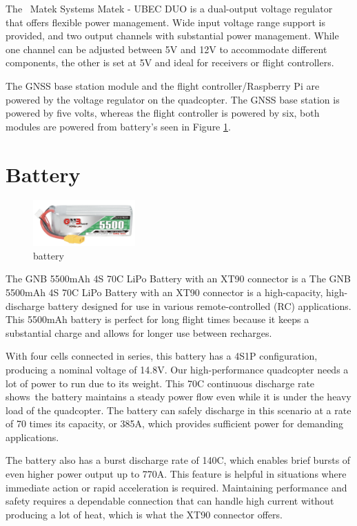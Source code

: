\documentclass{report}
\begin{document}
The  Matek Systems Matek - UBEC DUO is a dual-output voltage regulator that
offers flexible power management. Wide input voltage range support is provided,
and two output channels with substantial power management. While one channel can
be adjusted between 5V and 12V to accommodate different components, the other is
set at 5V and ideal for receivers or flight controllers.

The GNSS base station module and the flight controller/Raspberry Pi are powered
by the voltage regulator on the quadcopter. The GNSS base station is powered by
five volts, whereas the flight controller is powered by six, both modules are
powered from battery's seen in Figure \ref{battery}.

\section{Battery}\label{battery}
\begin{figure}[H]
  \centering
  \includegraphics[width=0.35\textwidth]{Pictures/battery.png}
  \caption{battery}
  \label{fig:battery}
\end{figure}
The GNB 5500mAh 4S 70C LiPo Battery with an XT90 connector is a The GNB 5500mAh
4S 70C LiPo Battery with an XT90 connector is a high-capacity, high-discharge
battery designed for use in various remote-controlled (RC) applications. This
5500mAh battery is perfect for long flight times because it keeps a substantial
charge and allows for longer use between recharges.

With four cells connected in series, this battery has a 4S1P configuration,
producing a nominal voltage of 14.8V. Our high-performance quadcopter needs a
lot of power to run due to its weight. This 70C continuous discharge rate
shows the battery maintains a steady power flow even while it is under the heavy
load of the quadcopter. The battery can safely discharge in this scenario at a
rate of 70 times its capacity, or 385A, which provides sufficient power for
demanding applications.

The battery also has a burst discharge rate of 140C, which enables brief bursts
of even higher power output up to 770A. This feature is helpful in situations
where immediate action or rapid acceleration is required. Maintaining
performance and safety requires a dependable connection that can handle high
current without producing a lot of heat, which is what the XT90 connector
offers.
\end{document}
